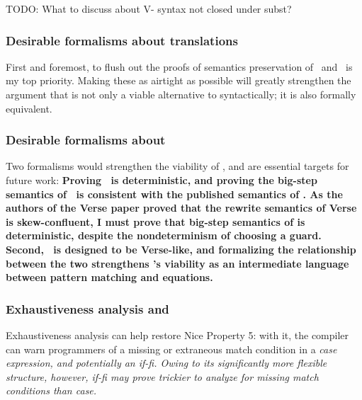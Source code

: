 \documentclass[manuscript,screen,review, 12pt, nonacm]{acmart}
\begin{document}
        TODO: What to discuss about V- syntax not closed under subst? 

        \subsubsection{Desirable formalisms about translations}
        First and foremost, to flush out the proofs of semantics preservation of
        \PTran\ and \DTran\ is my top priority. Making these as airtight as
        possible will greatly strengthen the argument that \VMinus is not only a
        viable alternative to \PPlus syntactically; it is also formally
        equivalent. 

        \subsubsection{Desirable formalisms about \VMinus}
        Two formalisms would strengthen the viability of \VMinus, and are
        essential targets for future work: \bf{Proving \VMinus~is
        deterministic}, and \bf{proving the big-step semantics of \VMinus~is
        consistent with the published semantics of \VC.} As the authors of the
        Verse paper proved that the rewrite semantics of Verse is
        skew-confluent, I must prove that big-step semantics of \VMinus is
        deterministic, despite the nondeterminism of choosing a guard. Second,
        \VMinus~is designed to be Verse-like, and formalizing the relationship
        between the two strengthens \VMinus's viability as an intermediate
        language between pattern matching and equations. 


        \subsubsection{Exhaustiveness analysis \PPlus and \VMinus}
        \label{typingppandvm}

        Exhaustiveness analysis can help restore Nice Property 5: with it,
        the compiler can warn programmers of a missing or extraneous match
        condition in a \it{case} expression, and potentially an \it{if-fi}.
        Owing to its significantly more flexible structure, however, \it{if-fi}
        may prove trickier to analyze for missing match conditions than
        \it{case}.

\end{document}
